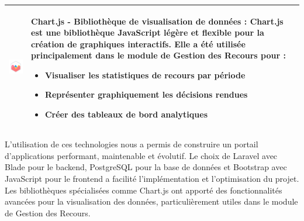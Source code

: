 \begin{longtable}{|m{4cm}|m{10cm}|}
    \includegraphics[width=3cm]{images/logo/chartjs.png} & 
    \textbf{Chart.js - Bibliothèque de visualisation de données} : Chart.js est une bibliothèque JavaScript légère et flexible pour la création de graphiques interactifs. Elle a été utilisée principalement dans le module de Gestion des Recours pour :  
    \begin{itemize}
        \item Visualiser les statistiques de recours par période
        \item Représenter graphiquement les décisions rendues
        \item Créer des tableaux de bord analytiques
    \end{itemize}\\
    \hline

 

\end{longtable}
\begin{center}  
    \label{tab:table_techs_realisation} %
\end{center}  

L'utilisation de ces technologies nous a permis de construire un portail d'applications performant, maintenable et évolutif. Le choix de Laravel avec Blade pour le backend, PostgreSQL pour la base de données et Bootstrap avec JavaScript pour le frontend a facilité l'implémentation et l'optimisation du projet. Les bibliothèques spécialisées comme Chart.js ont apporté des fonctionnalités avancées pour la visualisation des données, particulièrement utiles dans le module de Gestion des Recours.

